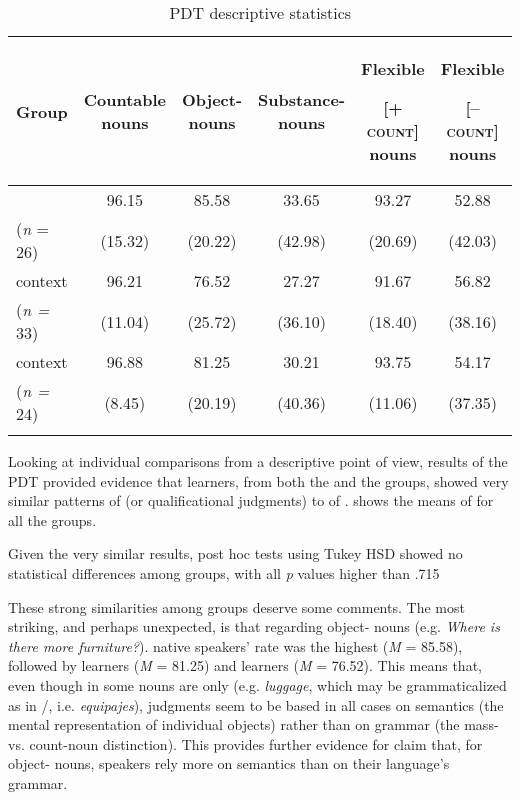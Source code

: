 \documentclass[output=paper]{langsci/langscibook}
\begin{document}
\begin{table}
\caption{PDT descriptive statistics}
\label{tab:thomas:7}
\small
\begin{tabularx}{\textwidth}{QSSSSS}
\lsptoprule
\bfseries Group & \bfseries Countable nouns & \bfseries Object- nouns & {\bfseries Substance- nouns} & {\bfseries Flexible} 

\bfseries [\textsc{+ count}] nouns & {{\bfseries Flexible}

\bfseries [\textsc{– count}] nouns}\\
\midrule
{} & 96.15 & {85.58} & 33.65 & {93.27} & 52.88\\
(\textit{n} = 26) & (15.32) & {(20.22)} & (42.98) & {(20.69)} & (42.03)\\
 context & 96.21 & {76.52} & 27.27 & {91.67} & 56.82\\
(\textit{n =} 33) & (11.04) & {(25.72)} & (36.10) & {(18.40)} & (38.16)\\
 context & 96.88 & {81.25} & 30.21 & {93.75} & 54.17\\
(\textit{n =} 24) & (8.45) & {(20.19)} & (40.36) & {(11.06)} & (37.35)\\
\lspbottomrule
\end{tabularx}
\end{table}

Looking at individual comparisons from a descriptive point of view, results of the PDT provided evidence that   learners, from both the  and the  groups, showed very similar patterns of  (or qualificational judgments) to  of .   shows the means of  for all the groups.  

Given the very similar results, post hoc tests using Tukey HSD showed no statistical differences among groups, with all \textit{p} values higher than .715 

These strong similarities among groups deserve some comments. The most striking, and perhaps unexpected, is that regarding object- nouns (e.g. \textit{Where is there more furniture?}).  native speakers’  rate was the highest (\textit{M} = 85.58), followed by  learners  (\textit{M} = 81.25) and  learners (\textit{M} = 76.52). This means that, even though in  some nouns are  only (e.g. \textit{luggage}, which may be grammaticalized as  in /, i.e. \textit{equipajes}), judgments seem to be based in all cases on semantics (the mental representation of individual objects) rather than on grammar (the mass- vs. count-noun distinction). This provides further evidence for  claim that, for object- nouns,  speakers rely more on semantics than on their language’s grammar. 
\end{document}
